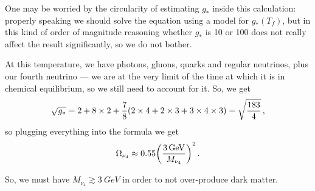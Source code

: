 \documentclass[main.tex]{subfiles}
\begin{document}
One may be worried by the circularity of estimating \(g_*\) inside this calculation: properly speaking we should solve the equation using a model for \(g_* (T_f)\), but in this kind of order of magnitude reasoning whether \(g_*\) is 10 or 100 does not really affect the result significantly, so we do not bother. 

At this temperature, we have photons, gluons, quarks and regular neutrinos, plus our fourth neutrino --- we are at the very limit of the time at which it is in chemical equilibrium, so we still need to account for it.
So, we get 
%
\begin{align}
\sqrt{g_*} = 2 + 8 \times 2 + \frac{7}{8} \qty(
    2 \times 4
    + 2 \times 3
    + 3 \times 4 \times 3
) = \sqrt{ \frac{183}{4}}
\,,
\end{align}
%
so plugging everything into the formula we get 
%
\begin{align}
\Omega_{\nu_4 } \approx \num{0.55} \qty(\frac{ \SI{3}{GeV}}{M_{\nu_4 }})^2
\,.
\end{align}

So, we must have \(M_{\nu_4 } \gtrsim \SI{3}{GeV}\) in order to not over-produce dark matter. 







\end{document}
